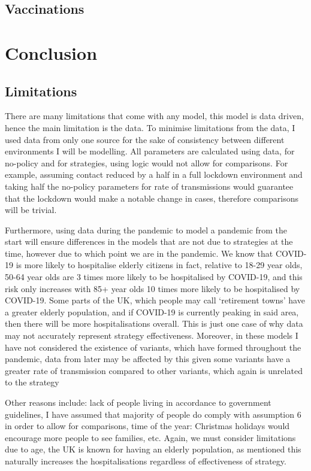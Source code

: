 \documentclass[11pt]{article}
\begin{document}
\subsection{Vaccinations}
\section{Conclusion}
\subsection{Limitations}
There are many limitations that come with any model, this model is data driven, hence the main limitation is the data. To minimise limitations from the data, I used data from only one source \citep{DataSource} for the sake of consistency between different environments I will be modelling. All parameters are calculated using data, for no-policy and for strategies, using logic would not allow for comparisons. For example, assuming contact reduced by a half in a full lockdown environment and taking half the no-policy parameters for rate of transmissions would guarantee that the lockdown would make a notable change in cases, therefore comparisons will be trivial. \par
Furthermore, using data during the pandemic to model a pandemic from the start will ensure differences in the models that are not due to strategies at the time, however due to which point we are in the pandemic. We know that COVID-19 is more likely to hospitalise elderly citizens in fact, relative to 18-29 year olds, 50-64 year olds are 3 times more likely to be hospitalised by COVID-19, and this risk only increases with 85+ year olds 10 times more likely to be hospitalised by COVID-19\citep{AGE}. Some parts of the UK, which people may call ‘retirement towns’ have a greater elderly population, and if COVID-19 is currently peaking in said area, then there will be more hospitalisations overall. This is just one case of why data may not accurately represent strategy effectiveness. Moreover, in these models I have not considered the existence of variants, which have formed throughout the pandemic, data from later may be affected by this given some variants have a greater rate of transmission compared to other variants, which again is unrelated to the strategy \par
Other reasons include: lack of people living in accordance to government guidelines, I have assumed that majority of people do comply with assumption $6$ in order to allow for comparisons, time of the year: Christmas holidays would encourage more people to see families, etc.  Again, we must consider limitations due to age, the UK is known for having an elderly population, as mentioned this naturally increases the hospitalisations regardless of effectiveness of strategy. \par
\end{document}
